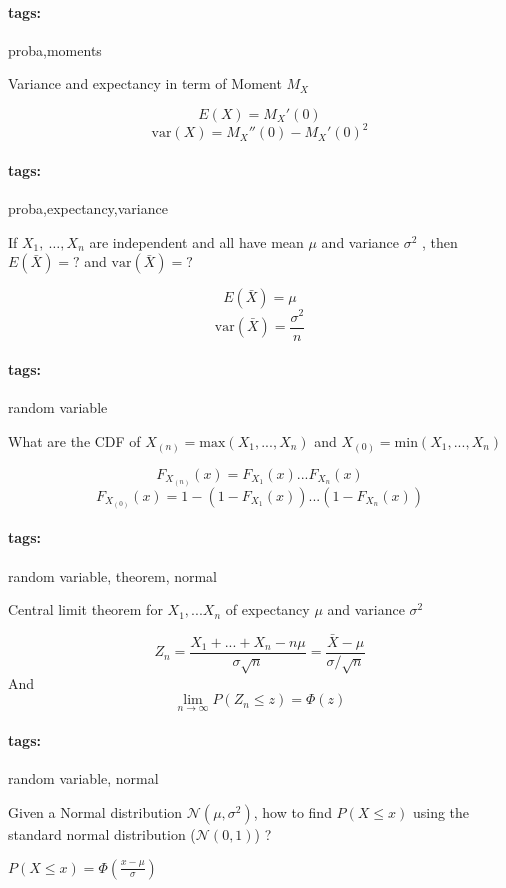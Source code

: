 \documentclass[12pt]{article}
\newcommand*{\xfield}[1]{\begin{mdframed}\centering #1\end{mdframed}\bigskip}
\newenvironment{note}{}{}
\newcommand*{\tags}[1]{\paragraph{tags: }#1}
\begin{document}
\begin{note}
	\tags{proba,moments}
	\xfield{Variance and expectancy in term of Moment $M_X$}
	\xfield{$$E(X) = M_X'(0)$$
$$\text{var}(X) = M_X''(0)-M_X'(0)^2$$}
\end{note}

\begin{note}
	\tags{proba,expectancy,variance}
	\xfield{If $X_1,\ \hdots, X_n$ are independent and all have mean $\mu$ and
    variance $\sigma^2$ , then $E(\bar{X}) = ?$ and $\text{var}(\bar{X})= ?$}
	\xfield{$$E(\bar{X}) = \mu$$
$$\text{var}(\bar{X}) = \frac{\sigma^2}{n}$$}
\end{note}

\begin{note}
  \tags{random variable}
\xfield{What are the CDF of $X_{(n)}=\text{max}(X_1,...,X_n)$ and $X_{(0)}=\text{min}(X_1,...,X_n)$}
\xfield{$$F_{X_{(n)}}(x)=F_{X_1}(x)...F_{X_n}(x)$$
$$F_{X_{(0)}}(x)=1-(1-F_{X_1}(x))...(1-F_{X_n}(x))$$}
\end{note}

\begin{note}
  \tags{random variable, theorem, normal}
  \xfield{Central limit theorem for $X_1,...X_n$ of expectancy $\mu$ and variance $\sigma^2$}
  \xfield{$$Z_n= \frac{X_1+...+X_n-n\mu}{\sigma \sqrt{n}} =
    \frac{\bar{X}-\mu}{\sigma/\sqrt{n}}$$
And $$\lim\limits_{n\to \infty} P(Z_n \le z) = \varPhi(z)$$}
\end{note}

\begin{note}
  \tags{random variable, normal}
\xfield{Given a Normal distribution $\mathcal{N}(\mu,\sigma^2)$, how to find
  $P(X \le x)$ using the standard normal distribution ($\mathcal{N}(0,1)$) ?}
\xfield{$P(X \le x) = \varPhi(\frac{x-\mu}{\sigma})$}
\end{note}
\end{document}
